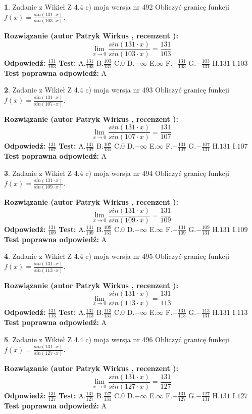 \documentclass[12pt, a4paper]{article}
\theoremstyle{definition} %
\newtheorem{zad}{}
\newcommand{\zadStart}[1]{\begin{zad}#1\newline}
\newcommand{\zadStop}{\end{zad}}
\newcommand{\rozwStart}[2]{\noindent \textbf{Rozwiązanie (autor #1 , recenzent #2): }\newline}
\newcommand{\rozwStop}{\newline}
\newcommand{\odpStart}{\noindent \textbf{Odpowiedź:}\newline}
\newcommand{\odpStop}{\newline}
\newcommand{\testStart}{\noindent \textbf{Test:}\newline}
\newcommand{\testStop}{\newline}
\newcommand{\kluczStart}{\noindent \textbf{Test poprawna odpowiedź:}\newline}
\newcommand{\kluczStop}{\newline}
\begin{document}
\zadStart{Zadanie z Wikieł Z 4.4 c) moja wersja nr 492}
Obliczyć granicę funkcji $f(x)=\frac{sin(131\cdot x)}{sin(103\cdot x)}$.
\zadStop
\rozwStart{Patryk Wirkus}{}
$$\lim\limits_{x\to 0}\frac{sin(131\cdot x)}{sin(103\cdot x)}=
\frac{131}{103}$$
\rozwStop
\odpStart
$\frac{131}{103}$
\odpStop
\testStart
A.$\frac{131}{103}$
B.$\frac{103}{131}$
C.$0$
D.$-\infty$
E.$\infty$
F.$-\frac{131}{103}$
G.$-\frac{103}{131}$
H.$131$
I.$103$
\testStop
\kluczStart
A
\kluczStop



\zadStart{Zadanie z Wikieł Z 4.4 c) moja wersja nr 493}
Obliczyć granicę funkcji $f(x)=\frac{sin(131\cdot x)}{sin(107\cdot x)}$.
\zadStop
\rozwStart{Patryk Wirkus}{}
$$\lim\limits_{x\to 0}\frac{sin(131\cdot x)}{sin(107\cdot x)}=
\frac{131}{107}$$
\rozwStop
\odpStart
$\frac{131}{107}$
\odpStop
\testStart
A.$\frac{131}{107}$
B.$\frac{107}{131}$
C.$0$
D.$-\infty$
E.$\infty$
F.$-\frac{131}{107}$
G.$-\frac{107}{131}$
H.$131$
I.$107$
\testStop
\kluczStart
A
\kluczStop



\zadStart{Zadanie z Wikieł Z 4.4 c) moja wersja nr 494}
Obliczyć granicę funkcji $f(x)=\frac{sin(131\cdot x)}{sin(109\cdot x)}$.
\zadStop
\rozwStart{Patryk Wirkus}{}
$$\lim\limits_{x\to 0}\frac{sin(131\cdot x)}{sin(109\cdot x)}=
\frac{131}{109}$$
\rozwStop
\odpStart
$\frac{131}{109}$
\odpStop
\testStart
A.$\frac{131}{109}$
B.$\frac{109}{131}$
C.$0$
D.$-\infty$
E.$\infty$
F.$-\frac{131}{109}$
G.$-\frac{109}{131}$
H.$131$
I.$109$
\testStop
\kluczStart
A
\kluczStop



\zadStart{Zadanie z Wikieł Z 4.4 c) moja wersja nr 495}
Obliczyć granicę funkcji $f(x)=\frac{sin(131\cdot x)}{sin(113\cdot x)}$.
\zadStop
\rozwStart{Patryk Wirkus}{}
$$\lim\limits_{x\to 0}\frac{sin(131\cdot x)}{sin(113\cdot x)}=
\frac{131}{113}$$
\rozwStop
\odpStart
$\frac{131}{113}$
\odpStop
\testStart
A.$\frac{131}{113}$
B.$\frac{113}{131}$
C.$0$
D.$-\infty$
E.$\infty$
F.$-\frac{131}{113}$
G.$-\frac{113}{131}$
H.$131$
I.$113$
\testStop
\kluczStart
A
\kluczStop



\zadStart{Zadanie z Wikieł Z 4.4 c) moja wersja nr 496}
Obliczyć granicę funkcji $f(x)=\frac{sin(131\cdot x)}{sin(127\cdot x)}$.
\zadStop
\rozwStart{Patryk Wirkus}{}
$$\lim\limits_{x\to 0}\frac{sin(131\cdot x)}{sin(127\cdot x)}=
\frac{131}{127}$$
\rozwStop
\odpStart
$\frac{131}{127}$
\odpStop
\testStart
A.$\frac{131}{127}$
B.$\frac{127}{131}$
C.$0$
D.$-\infty$
E.$\infty$
F.$-\frac{131}{127}$
G.$-\frac{127}{131}$
H.$131$
I.$127$
\testStop
\kluczStart
A
\kluczStop
\end{document}
